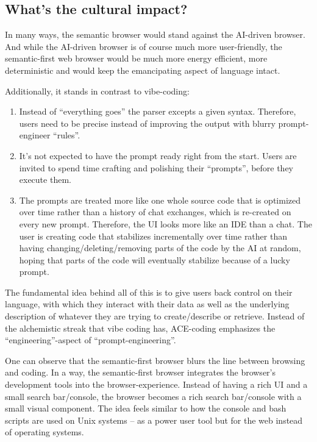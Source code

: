 \documentclass[12pt,a4paper]{article}
\begin{document}
\subsection{What's the cultural impact?}

In many ways, the semantic browser would stand against the AI-driven browser. And while the AI-driven browser is of course much more user-friendly, the semantic-first web browser would be much more energy efficient, more deterministic and would keep the emancipating aspect of language intact.

Additionally, it stands in contrast to vibe-coding:

\begin{enumerate}
    \item Instead of ``everything goes'' the parser excepts a given syntax. Therefore, users need to be precise instead of improving the output with blurry prompt-engineer ``rules''.
    \item It's not expected to have the prompt ready right from the start. Users are invited to spend time crafting and polishing their ``prompts'', before they execute them.
    \item The prompts are treated more like one whole source code that is optimized over time rather than a history of chat exchanges, which is re-created on every new prompt. Therefore, the UI looks more like an IDE than a chat. The user is creating code that stabilizes incrementally over time rather than having changing/deleting/removing parts of the code by the AI at random, hoping that parts of the code will eventually stabilize because of a lucky prompt.
\end{enumerate}

The fundamental idea behind all of this is to give users back control on their language, with which they interact with their data as well as the underlying description of whatever they are trying to create/describe or retrieve. Instead of the alchemistic streak that vibe coding has, ACE-coding emphasizes the ``engineering''-aspect of ``prompt-engineering''.

One can observe that the semantic-first browser blurs the line between browsing and coding. In a way, the semantic-first browser integrates the browser's development tools into the browser-experience. Instead of having a rich UI and a small search bar/console, the browser becomes a rich search bar/console with a small visual component. The idea feels similar to how the console and bash scripts are used on Unix systems -- as a power user tool but for the web instead of operating systems.
\end{document}
